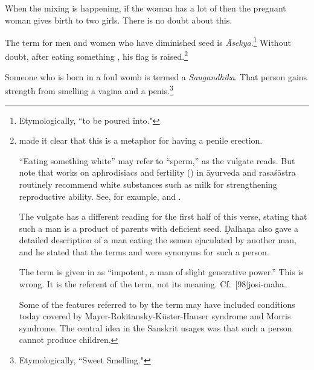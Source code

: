 \begin{translation}
\item [3.2.37.2]
\begin{sloka}
    When the mixing is happening, if the woman has a lot of 
     then the pregnant woman gives birth to two girls.
    There is no doubt about this. 
\end{sloka}

\item[3.2.38]

The term for men and women who have diminished seed is 
\emph{Āsekya}.\footnote{Etymologically, “to be poured into."}  Without 
doubt, after eating something 
, his flag is raised.\footnote{ made 
it clear that this is a metaphor for having a penile erection.\label{erection}

“Eating something white” may refer to  “sperm,” as the
vulgate reads.  But note that works on aphrodisiacs and fertility
() in āyurveda and rasaśāstra routinely recommend
white substances such as milk for strengthening reproductive ability.
See, for example,  and .

The vulgate has a different reading for the first half of this verse, stating that 
such a man is a product of parents with deficient seed.  Ḍalhaṇa also gave a 
detailed description of a man eating the semen ejaculated by another man, 
and he stated that the terms  and  were 
synonyms for such a person.

The term  is given in \cite[161]{moni-sans} as “impotent,
a man of slight generative power.”  This is wrong.  It is the
referent of the term, not its meaning. Cf.\ [98]{josi-maha}.

Some of the features referred to by the term  may
have included conditions today covered by
Mayer-Rokitansky-Küster-Hauser syndrome and Morris syndrome.  The
central idea in the Sanskrit usages was that such a person cannot
produce children.}

\item[39]

Someone who is born in a foul womb is termed a \emph{Saugandhika}. 
That person gains strength from smelling a vagina and a
penis.\footnote{Etymologically, “Sweet Smelling."}

\item[40abc]


\end{translation}

